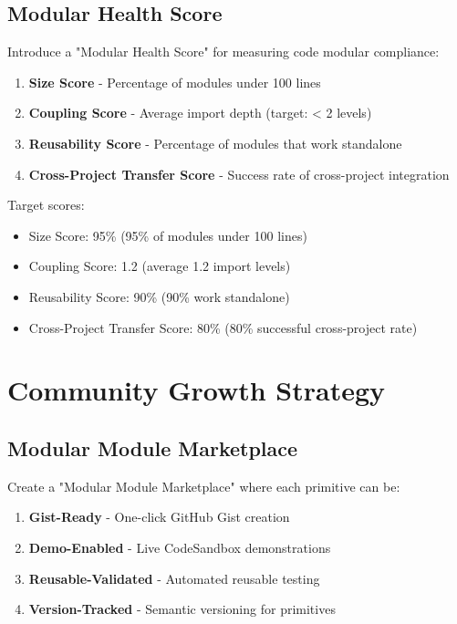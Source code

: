 \documentclass[11pt]{article}
\begin{document}
\subsection{Modular Health Score}

Introduce a "Modular Health Score" for measuring code modular compliance:

\begin{enumerate}
\item \textbf{Size Score} - Percentage of modules under 100 lines
\item \textbf{Coupling Score} - Average import depth (target: < 2 levels)
\item \textbf{Reusability Score} - Percentage of modules that work standalone
\item \textbf{Cross-Project Transfer Score} - Success rate of cross-project integration
\end{enumerate}

Target scores:
\begin{itemize}
\item Size Score: 95\% (95\% of modules under 100 lines)
\item Coupling Score: 1.2 (average 1.2 import levels)
\item Reusability Score: 90\% (90\% work standalone)
\item Cross-Project Transfer Score: 80\% (80\% successful cross-project rate)
\end{itemize}

\section{Community Growth Strategy}

\subsection{Modular Module Marketplace}

Create a "Modular Module Marketplace" where each primitive can be:

\begin{enumerate}
\item \textbf{Gist-Ready} - One-click GitHub Gist creation
\item \textbf{Demo-Enabled} - Live CodeSandbox demonstrations
\item \textbf{Reusable-Validated} - Automated reusable testing
\item \textbf{Version-Tracked} - Semantic versioning for primitives
\end{enumerate}
\end{document}
